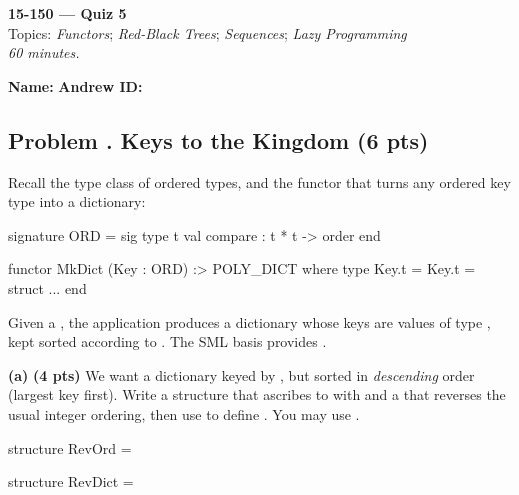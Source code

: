 \documentclass[crop=false]{standalone}
\newif\ifsol
\newcommand{\quizproblem}[3]{%
  \needspace{5\baselineskip}%
  \stepcounter{problem}%
  \ifsol
    \subsection*{Problem \arabic{problem}. #1 \hfill \timing{#2} \quad (#3 pts)}%
  \else
    \subsection*{Problem \arabic{problem}. #1 \hfill (#3 pts)}%
  \fi
}
\newcommand{\subpts}[1]{\textbf{(#1 pts)}}
\begin{document}
\begin{center}
  {\Large \textbf{15-150 --- Quiz 5}} \\
  \vspace{4pt}
  Topics: \textit{Functors}; \textit{Red-Black
  Trees}; \textit{Sequences}; \textit{Lazy Programming} \\
  \vspace{4pt}
  \textit{60 minutes.}
\end{center}

\vspace{1em}

\noindent\textbf{Name:} \hrulefill \hspace{2em} \textbf{Andrew ID:} \hrulefill

\vspace{1em}


\quizproblem{Keys to the Kingdom}{7}{6}

Recall the type class of ordered types, and the functor 
that turns any ordered key type into a dictionary:

\begin{codeblock}
  signature ORD =
    sig
      type t
      val compare : t * t -> order
    end

  functor MkDict (Key : ORD) :> POLY_DICT where type Key.t = Key.t =
    struct ... end
\end{codeblock}

Given a , the application 
produces a dictionary whose keys are values of type , kept
sorted according to . The SML basis provides
.

\textbf{(a)} \subpts{4} We want a dictionary keyed by , but
sorted in \emph{descending} order (largest key first). Write a structure
 that ascribes to  with  and a
 that reverses the usual integer ordering, then use
 to define . You may use .

\begin{codeblock}
  structure RevOrd =







  structure RevDict =

\end{codeblock}
\end{document}
